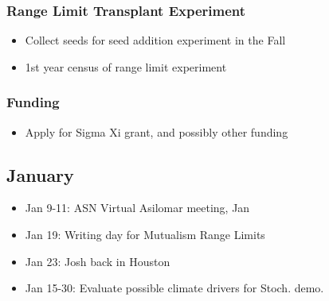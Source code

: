 \documentclass{article}
\begin{document}
\subsubsection*{Range Limit Transplant Experiment}
\begin{itemize}
\item{Collect seeds for seed addition experiment in the Fall}
\item{1st year census of range limit experiment}
\end{itemize}

\subsubsection*{Funding}
\begin{itemize}
\item{Apply for Sigma Xi grant, and possibly other funding}
\end{itemize}

\subsection*{January}
\begin{itemize}
\item{Jan 9-11: ASN Virtual Asilomar meeting, Jan}
\item{Jan 19: Writing day for Mutualism Range Limits}
\item{Jan 23: Josh back in Houston}
\item{Jan 15-30: Evaluate possible climate drivers for Stoch. demo.}
\end{itemize}
\end{document}
